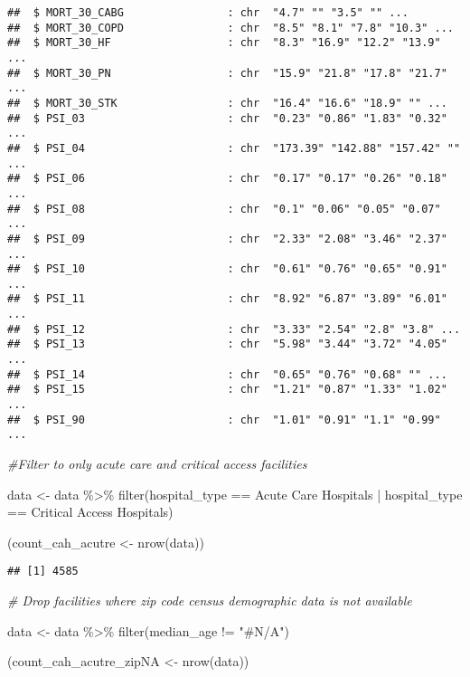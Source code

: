 \documentclass[
]{article}
\newenvironment{Shaded}{\begin{snugshade}}{\end{snugshade}}
\newcommand{\CommentTok}[1]{\textcolor[rgb]{0.56,0.35,0.01}{\textit{#1}}}
\newcommand{\FunctionTok}[1]{\textcolor[rgb]{0.00,0.00,0.00}{#1}}
\newcommand{\NormalTok}[1]{#1}
\newcommand{\OtherTok}[1]{\textcolor[rgb]{0.56,0.35,0.01}{#1}}
\newcommand{\SpecialCharTok}[1]{\textcolor[rgb]{0.00,0.00,0.00}{#1}}
\newcommand{\StringTok}[1]{\textcolor[rgb]{0.31,0.60,0.02}{#1}}
\begin{document}
\begin{verbatim}
##  $ MORT_30_CABG                : chr  "4.7" "" "3.5" "" ...
##  $ MORT_30_COPD                : chr  "8.5" "8.1" "7.8" "10.3" ...
##  $ MORT_30_HF                  : chr  "8.3" "16.9" "12.2" "13.9" ...
##  $ MORT_30_PN                  : chr  "15.9" "21.8" "17.8" "21.7" ...
##  $ MORT_30_STK                 : chr  "16.4" "16.6" "18.9" "" ...
##  $ PSI_03                      : chr  "0.23" "0.86" "1.83" "0.32" ...
##  $ PSI_04                      : chr  "173.39" "142.88" "157.42" "" ...
##  $ PSI_06                      : chr  "0.17" "0.17" "0.26" "0.18" ...
##  $ PSI_08                      : chr  "0.1" "0.06" "0.05" "0.07" ...
##  $ PSI_09                      : chr  "2.33" "2.08" "3.46" "2.37" ...
##  $ PSI_10                      : chr  "0.61" "0.76" "0.65" "0.91" ...
##  $ PSI_11                      : chr  "8.92" "6.87" "3.89" "6.01" ...
##  $ PSI_12                      : chr  "3.33" "2.54" "2.8" "3.8" ...
##  $ PSI_13                      : chr  "5.98" "3.44" "3.72" "4.05" ...
##  $ PSI_14                      : chr  "0.65" "0.76" "0.68" "" ...
##  $ PSI_15                      : chr  "1.21" "0.87" "1.33" "1.02" ...
##  $ PSI_90                      : chr  "1.01" "0.91" "1.1" "0.99" ...
\end{verbatim}

\begin{Shaded}
\begin{Highlighting}[]
\CommentTok{\#Filter to only acute care and critical access facilities}

\NormalTok{data }\OtherTok{\textless{}{-}}\NormalTok{ data }\SpecialCharTok{\%\textgreater{}\%} \FunctionTok{filter}\NormalTok{(hospital\_type }\SpecialCharTok{==} \StringTok{\textquotesingle{}Acute Care Hospitals\textquotesingle{}} \SpecialCharTok{|}\NormalTok{  hospital\_type }\SpecialCharTok{==} \StringTok{\textquotesingle{}Critical Access Hospitals\textquotesingle{}}\NormalTok{) }

\NormalTok{(count\_cah\_acutre }\OtherTok{\textless{}{-}} \FunctionTok{nrow}\NormalTok{(data))}
\end{Highlighting}
\end{Shaded}

\begin{verbatim}
## [1] 4585
\end{verbatim}

\begin{Shaded}
\begin{Highlighting}[]
\CommentTok{\# Drop facilities where zip code census demographic data is not available}

\NormalTok{data }\OtherTok{\textless{}{-}}\NormalTok{ data }\SpecialCharTok{\%\textgreater{}\%} \FunctionTok{filter}\NormalTok{(median\_age }\SpecialCharTok{!=} \StringTok{"\#N/A"}\NormalTok{) }

\NormalTok{(count\_cah\_acutre\_zipNA }\OtherTok{\textless{}{-}} \FunctionTok{nrow}\NormalTok{(data))}
\end{Highlighting}
\end{Shaded}
\end{document}
